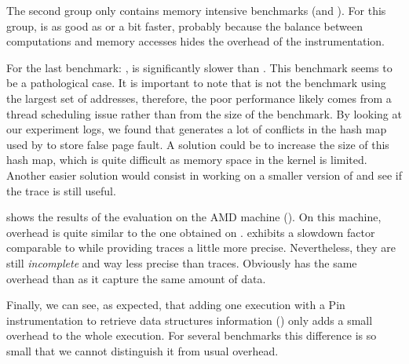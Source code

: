 The second group only contains memory intensive benchmarks (\FT and
\IS). For this group, \Moca is as good as \TABARNAC or a bit faster, probably
because the balance between computations and memory accesses hides the
overhead of the instrumentation.

For the last benchmark: \MG, \Moca is significantly slower than \TABARNAC. This benchmark
seems to be a pathological case. It is important to note that \MG is not the
benchmark using the largest set of addresses, therefore, the poor performance likely comes from a
thread scheduling issue
rather than from the size of the benchmark. By looking at our
experiment logs, we found that \MG generates a lot of conflicts in the hash map used by
\Moca to store false page fault. A solution could be to increase the size of
this hash map, which is quite difficult as memory space in the kernel is
limited. Another easier solution would consist in working on a smaller version
of \MG and see if the trace is still useful.

 shows the results of the evaluation on the AMD machine
(\Stremi). On this machine, \Moca overhead is quite similar to the one
obtained on \Edel.
\MemProf exhibits a slowdown factor comparable to \Mitos while
providing traces a little more precise. Nevertheless, they are still \emph{incomplete} and
way less precise than \Moca traces. Obviously \MemProfTun has the same
overhead than \MemProf as it capture the same amount of data.

Finally, we can see, as expected, that adding one execution with a Pin
instrumentation to retrieve data structures information (\MocaPin) only adds a small overhead
to the whole \Moca execution. For several benchmarks this difference is so small that we cannot
distinguish it from \Moca usual overhead.

